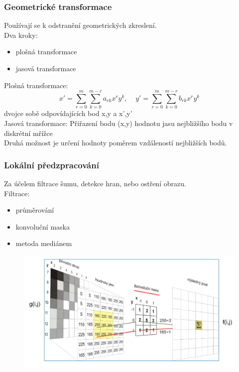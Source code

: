\subsubsection{Geometrické transformace}
Používají se k odstranění geometrických zkreslení.\\
Dva kroky:
\begin{itemize}
    \item plošná transformace
    \item jasová transformace
\end{itemize}
Plošná transformace:
\begin{equation}
    x' = \sum_{r =0}^m \sum_{k=0}^{m-r}a_{rk}x^ry^k, \;\;\;\; y' = \sum_{r =0}^m \sum_{k=0}^{m-r}b_{rk}x^ry^k
\end{equation}
dvojce sobě odpovídajících bod x,y a x',y'\\
Jasová transformace:
Přiřazení bodu (x,y) hodnotu jasu nejbližšího bodu v diskrétní mřížce\\
Druhá možnost je určení hodnoty poměrem vzdáleností nejbližších bodů.\\
\newpage
\subsubsection{Lokální předzpracování}
Za účelem filtrace šumu, detekce hran, nebo ostření obrazu.\\
Filtrace:
\begin{itemize}
    \item průměrování
    \item konvoluční maska
    \item metoda mediánem
\end{itemize}
\begin{figure}[H]
    \includegraphics[scale = 0.25]{images/konvoluce_maska.png}
\end{figure}

